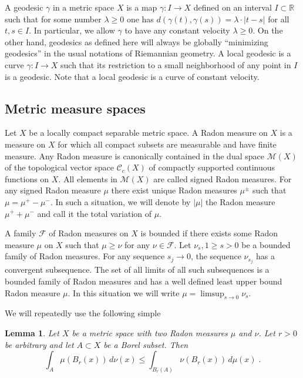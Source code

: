 \documentclass[12pt,leqno]{amsart}
\numberwithin{equation}{section}
\newtheorem{lem}[thm]{Lemma}
\theoremstyle{definition}
\theoremstyle{remark}
\newcommand{\R}{\mathbb{R}}
\def\:{\colon}
\begin{document}
A geodesic $\gamma$ in a metric space $X$ is  a map $\gamma \:I\to X$ defined on an interval $I \subset \R$ such that for some number $\lambda \geq 0$ one has
$d(\gamma (t),\gamma (s)) =\lambda \cdot |t-s|$ for all $t,s\in I$. In particular, we allow $\gamma$ to have any constant velocity $\lambda \geq 0$. On the other hand, geodesics
as defined here will always be globally ``minimizing geodesics'' in the usual notations of Riemannian geometry.
A local geodesic is a curve $\gamma\: I\to X$ such that its restriction to a small neighborhood of any point in $I$ is  a geodesic. Note that a local geodesic is a curve of constant velocity.

\subsection{Metric measure spaces}
Let $X$ be a locally compact separable metric space. A Radon measure on $X$ is a measure on $X$ for which all compact subsets are measurable and have finite measure.
Any Radon measure is canonically contained in the dual space $\mathcal M(X)$ of the topological vector space $\mathcal C_c (X)$ of compactly supported continuous functions on $X$.
All elements in $\mathcal M(X)$ are called signed Radon measures. For any signed Radon measure $\mu$ there exist unique Radon measures $\mu ^{\pm}$ such that $\mu =\mu ^+- \mu ^-$.
In such a situation, we will denote by $|\mu |$ the Radon measure $\mu ^+ +\mu ^-$ and call it the total variation of $\mu$.



 A family   $\mathcal F$ of Radon measures on $X$ is bounded if there exists some Radon measure $\mu$ on $X$ such that $\mu \geq \nu $ for any $\nu \in \mathcal F$.  Let $\nu _s, 1\geq s >0$ be a bounded family of Radon measures. For any sequence $s_j\to 0$, the sequence $\nu _{s_j}$ has a convergent
subsequence. The set of all limits of all such subsequences is a bounded family of Radon measures and has a well defined least upper bound Radon measure $\mu$. In  this situation we will write $\mu =\limsup _{s\to 0} \nu _s$.

We will repeatedly use the following simple


\begin{lem} \label{lem:exchange}
Let $X$ be a metric space with two Radon measures $\mu $ and $\nu$. Let $r>0$ be arbitrary and let  $A\subset X$ be a Borel subset. Then
 $$\int _A \mu (B_r(x)) \, d\nu (x) \leq \int _{B_r (A)}  \nu (B_r (x)) \, d\mu (x) \; .$$
\end{lem}
\end{document}
